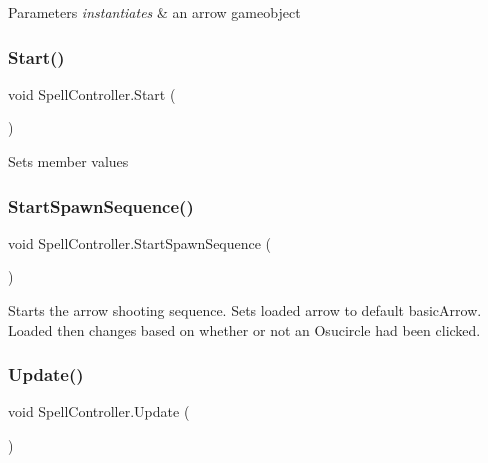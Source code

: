 \begin{DoxyParams}{Parameters}
{\em instantiates} & an arrow gameobject \\
\hline
\end{DoxyParams}
\mbox{\label{class_spell_controller_a63da1ad10f9cb7931912cd60704875f5}} 
\subsubsection{\texorpdfstring{Start()}{Start()}}
{\footnotesize\ttfamily void Spell\+Controller.\+Start (\begin{DoxyParamCaption}{ }\end{DoxyParamCaption})}

Sets member values \mbox{\label{class_spell_controller_a60e9f69e1644149911c54e667a297ba8}} 
\subsubsection{\texorpdfstring{Start\+Spawn\+Sequence()}{StartSpawnSequence()}}
{\footnotesize\ttfamily void Spell\+Controller.\+Start\+Spawn\+Sequence (\begin{DoxyParamCaption}{ }\end{DoxyParamCaption})}

Starts the arrow shooting sequence. Sets loaded arrow to default basic\+Arrow. Loaded then changes based on whether or not an Osucircle had been clicked. \mbox{\label{class_spell_controller_a21bc9cc1d9dcf0fdebc52754a9008552}} 
\subsubsection{\texorpdfstring{Update()}{Update()}}
{\footnotesize\ttfamily void Spell\+Controller.\+Update (\begin{DoxyParamCaption}{ }\end{DoxyParamCaption})}

